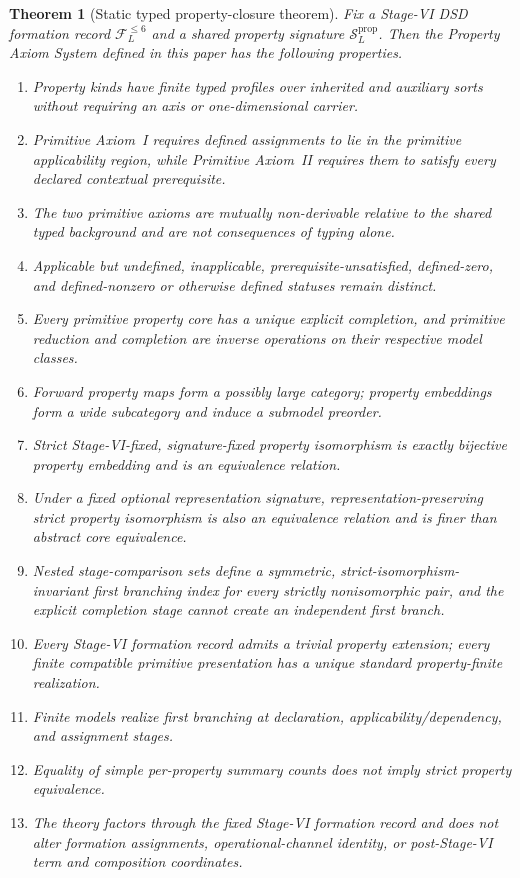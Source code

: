 \documentclass[11pt]{article}
\newcommand{\FVI}{\mathcal F_{L}^{\le 6}}
\newcommand{\Sprop}{\mathcal S_{L}^{\mathrm{prop}}}
\newtheorem{theorem}{Theorem}[section]
\theoremstyle{definition}
\theoremstyle{remark}
\begin{document}
\begin{theorem}[Static typed property-closure theorem]
\label{thm:main}
Fix a Stage-VI DSD formation record \(\FVI\) and a shared property signature \(\Sprop\).
Then the Property Axiom System defined in this paper has the following properties.
\begin{enumerate}[label=(\arabic*)]
\item Property kinds have finite typed profiles over inherited and auxiliary sorts without requiring an axis or one-dimensional carrier.
\item Primitive Axiom~I requires defined assignments to lie in the primitive applicability region, while Primitive Axiom~II requires them to satisfy every declared contextual prerequisite.
\item The two primitive axioms are mutually non-derivable relative to the shared typed background and are not consequences of typing alone.
\item Applicable but undefined, inapplicable, prerequisite-unsatisfied, defined-zero, and defined-nonzero or otherwise defined statuses remain distinct.
\item Every primitive property core has a unique explicit completion, and primitive reduction and completion are inverse operations on their respective model classes.
\item Forward property maps form a possibly large category; property embeddings form a wide subcategory and induce a submodel preorder.
\item Strict Stage-VI-fixed, signature-fixed property isomorphism is exactly bijective property embedding and is an equivalence relation.
\item Under a fixed optional representation signature, representation-preserving strict property isomorphism is also an equivalence relation and is finer than abstract core equivalence.
\item Nested stage-comparison sets define a symmetric, strict-isomorphism-invariant first branching index for every strictly nonisomorphic pair, and the explicit completion stage cannot create an independent first branch.
\item Every Stage-VI formation record admits a trivial property extension; every finite compatible primitive presentation has a unique standard property-finite realization.
\item Finite models realize first branching at declaration, applicability/dependency, and assignment stages.
\item Equality of simple per-property summary counts does not imply strict property equivalence.
\item The theory factors through the fixed Stage-VI formation record and does not alter formation assignments, operational-channel identity, or post-Stage-VI term and composition coordinates.
\end{enumerate}
\end{theorem}
\end{document}
